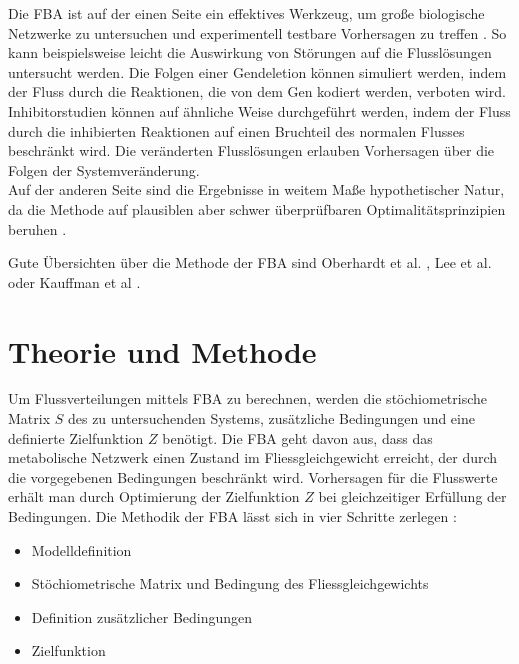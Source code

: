 Die FBA ist auf der einen Seite ein effektives Werkzeug, um große biologische Netzwerke zu untersuchen und experimentell testbare Vorhersagen zu treffen \cite{Lee2006}. So kann beispielsweise leicht die Auswirkung von Störungen auf die Flusslösungen untersucht werden. Die Folgen einer Gendeletion können simuliert werden, indem der Fluss durch die Reaktionen, die von dem Gen kodiert werden, verboten wird. Inhibitorstudien können auf ähnliche Weise durchgeführt werden, indem der Fluss durch die inhibierten Reaktionen auf einen Bruchteil des normalen Flusses beschränkt wird. Die veränderten Flusslösungen erlauben Vorhersagen über die Folgen der Systemveränderung.\\
Auf der anderen Seite sind die Ergebnisse in weitem Maße hypothetischer Natur, da die Methode auf plausiblen aber schwer überprüfbaren Optimalitätsprinzipien beruhen \cite{Hoppe2007}.

Gute Übersichten über die Methode der FBA sind Oberhardt et al. \cite{Oberhardt2009}, Lee et al. \cite{Lee2006} oder Kauffman et al \cite{Kauffman2003}.

\section{Theorie und Methode}
Um Flussverteilungen mittels FBA zu berechnen, werden die stöchiometrische Matrix $S$ des zu untersuchenden Systems, zusätzliche Bedingungen und eine definierte Zielfunktion $Z$ benötigt. Die FBA geht davon aus, dass das metabolische Netzwerk einen Zustand im Fliessgleichgewicht erreicht, der durch die vorgegebenen Bedingungen beschränkt wird. Vorhersagen für die Flusswerte erhält man durch Optimierung der Zielfunktion $Z$ bei gleichzeitiger Erfüllung der Bedingungen. Die Methodik der FBA lässt sich in vier Schritte zerlegen \cite{Kauffman2003}: 
\begin{itemize}
 \item Modelldefinition
 \item Stöchiometrische Matrix und Bedingung des Fliessgleichgewichts
 \item Definition zusätzlicher Bedingungen
 \item Zielfunktion
\end{itemize}

